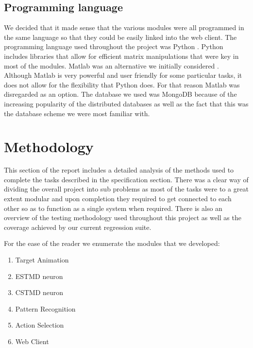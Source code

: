 \documentclass[a4paper,11pt]{article}
\begin{document}
\subsection{Programming language}
We decided that it made sense that the various modules were all programmed in the same language so that they could be easily linked into the web client. The programming language used throughout the project was Python \cite{python}. Python includes libraries that allow for efficient matrix manipulations that were key in most of the modules. Matlab was an alternative we initially considered \cite{matlab}. Although Matlab is very powerful and user friendly for some particular tasks, it does not allow for the flexibility that Python does. For that reason Matlab was disregarded as an option.
The database we used was MongoDB because of the increasing popularity of the distributed databases as well as the fact that this was the database scheme we were most familiar with.


\clearpage
\section{Methodology}
This section of the report includes a detailed analysis of the methods used to complete the tasks described in the specification section. There was a clear way of dividing the overall project into sub problems as most of the tasks were to a great extent modular and upon completion they required to get connected to each other so as to function as a single system when required. There is also an overview of the testing methodology used throughout this project as well as the coverage achieved by our current regression suite.

For the ease of the reader we enumerate the modules that we developed:
\begin{enumerate}
\item{Target Animation}
\item{ESTMD neuron}
\item{CSTMD neuron}
\item{Pattern Recognition}
\item{Action Selection}
\item{Web Client}
\end{enumerate}
\end{document}

